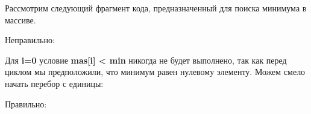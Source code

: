 \begin{typerror}
	\label{TE_for-from-0-instead-of-1}

	Рассмотрим следующий фрагмент кода, предназначенный для поиска минимума в массиве.

	Неправильно:

	Для \textbf{i=0} условие \textbf{mas[i] < min} никогда не будет выполнено,
	так как перед циклом мы предположили, что минимум равен нулевому элементу.
	Можем смело начать перебор с единицы:

	Правильно:

\end{typerror}
